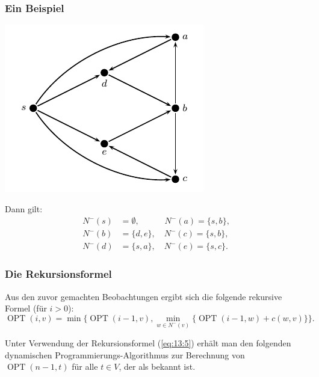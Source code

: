 \documentclass[smaller,xcolor=dvipsnames]{beamer}
\DeclareMathOperator{\opt}{OPT}
\begin{document}
\begin{frame}
\frametitle{Ein Beispiel}
\begin{center}
 \includegraphics[scale = 1]{fig98.pdf}
\end{center}

Dann gilt:
\begin{align*}
N^-(s) &= \emptyset, \quad\quad\quad N^-(a) = \{ s,b \}, \\
N^-(b) &= \{ d,e \}, \quad N^-(c) = \{ s,b \}, \\
N^-(d) &= \{ s,a \}, \quad N^-(e) = \{ s,c \}.
\end{align*}
\end{frame}

\begin{frame}
\frametitle{Die Rekursionsformel}
 Aus den zuvor gemachten Beobachtungen ergibt sich die folgende \alert{rekursive Formel (f\"ur $i>0$):}
\begin{equation}
\label{eq:13:5}
\opt{(i,v)} = \min \Big\{ \opt{(i-1,v)}, \min\limits_{w \in N^-(v)}\big\{ \opt{(i-1,w)} + c(w,v) \big\}\Big\}.
\end{equation}

Unter Verwendung der Rekursionsformel (\ref{eq:13:5}) erhält man den folgenden dynamischen Pro\-gram\-mie\-rungs-Algorithmus zur Berechnung von $\opt{(n-1,t)}$ für alle $t \in V$, der als  bekannt ist.
\end{frame}
\end{document}
